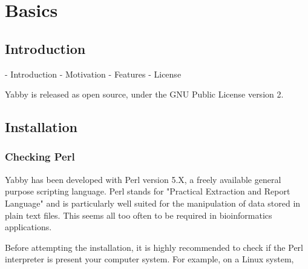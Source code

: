 

\setcounter{section}{0}

\chapter{Basics}

\section{Introduction}

- Introduction
- Motivation
- Features
- License

Yabby is released as open source, under the GNU Public License
version 2.

\section{Installation}

\subsection{Checking Perl}


Yabby has been developed with Perl version 5.X, a freely available
general purpose scripting language. Perl stands for "Practical
Extraction and Report Language" and is particularly well suited for
the manipulation of data stored in plain text files. This seems
all too often to be required in bioinformatics applications.

Before attempting the installation, it is highly recommended to
check if the Perl interpreter is present your computer system.
For example, on a Linux system,

